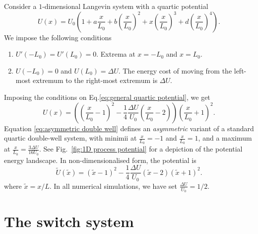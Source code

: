 \documentclass[]{cam-thesis}
\begin{document}
Consider a $1$-dimensional Langevin system with a quartic potential
\begin{equation} \label{eq:general quartic potential}
	U(x) = U_0 \left( 1 + a \frac{x}{L_0} + b \left( \frac{x}{L_0} \right)^2 + x \left( \frac{x}{L_0} \right)^3  + d \left( \frac{x}{L_0} \right)^4  \right).
\end{equation}
We impose the following conditions
\begin{enumerate}
\item $U'(-L_0) = U'(L_0) = 0$. Extrema at $x = -L_0$ and $x= L_0$.
\item $U(-L_0) = 0$ and $U(L_0) = \Delta U$. The energy cost of moving from the left-most extremum to the right-most extremum is $\Delta U$.
\end{enumerate}
Imposing the conditions on Eq.\ref{eq:general quartic potential}, we get
\begin{equation}  \label{eq:asymmetric double well}
U(x)= \left( \left(\frac{x}{L_0}-1\right)^{2}-\frac{1}{4}\frac{\Delta U}{U_{0}}\left(\frac{x}{L_0}-2\right)\right)\left(\frac{x}{L_0}+1\right)^{2}. 
\end{equation}
Equation \ref{eq:asymmetric double well} defines an \textit{asymmetric} variant of a standard quartic double-well system, with minimii at $\frac{x}{L_0}= -1$ and $\frac{x}{L_0}=1$, and a maximum at $\frac{x}{L_0} = \frac{ 3 \Delta U}{16 U_0}$. See Fig.~\ref{fig:1D process potential} for a depiction of the potential energy landscape. In non-dimensionalised form, the potential is
\begin{equation}  \label{eq:asymmetric double well nondim}
\tilde{U}(\tilde{x})= \left( \tilde{x}-1\right)^{2} - \frac{1}{4} \frac{\Delta U}{U_{0}} \left( \tilde{x}-2 \right) \left(\tilde{x}+1\right)^{2}. 
\end{equation}
where $\tilde{x} = x / L$. In all numerical simulations, we have set $\frac{\Delta U}{U_{0}}=1/2$.

\section{The switch system} \label{app:The switch system}
\end{document}
